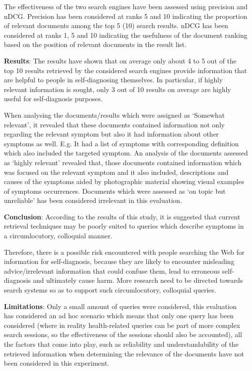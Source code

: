 \documentclass[]{article}
\begin{document}
The effectiveness of the two search engines have been assessed using precision and nDCG. Precision has been considered at ranks 5 and 10 indicating the proportion of relevant documents among the top 5 (10) search results. nDCG has been considered at ranks 1, 5 and 10 indicating the usefulness of the document ranking based on the position of relevant documents in the result list.
     
\textbf{Results}: The results have shown that on average only about 4 to 5 out of the top 10 results retrieved by the considered search engines provide information that are helpful to people in self-diagnosing themselves. In particular, if highly relevant information is sought, only 3 out of 10 results on average are highly useful for self-diagnosis purposes.

When analysing the documents/results which were assigned as ‘Somewhat relevant’, it revealed that these documents contained information not only regarding the relevant symptom but also it had information about other symptoms as well. E.g. It had a list of symptoms with corresponding definition which also included the targeted symptom. An analysis of the documents assessed as ‘highly relevant’ revealed that, those documents contained information which was focused on the relevant symptom and it also included, descriptions and causes of the symptoms aided by photographic material showing visual examples of symptoms occurrences. Documents which were assessed as ‘on topic but unreliable’ has been considered irrelevant in this evaluation.
      
\textbf{Conclusion}: According to the results of this study, it is suggested that current retrieval techniques may be poorly suited to queries which describe symptoms in a circumlocutory, colloquial manner. 

Therefore, there is a possible risk encountered with people searching the Web for information for self-diagnosis, because they are likely to encounter misleading advice/irrelevant information that could confuse them, lead to erroneous self-diagnosis and ultimately cause harm. 
More research need to be directed towards search systems so as to support such circumlocutory, colloquial queries. 
  
\textbf{Limitations}: Only a small amount of queries were considered, this evaluation has considered an ad hoc scenario which means that only one query has been considered (where in reality health-related queries can be part of more complex search sessions, so the effectiveness of the sessions should also be accounted), all the factors that come into play, such as reliability and understandability of the retrieved information when determining the relevance of the documents have not been considered in this experiment. 
\end{document}
